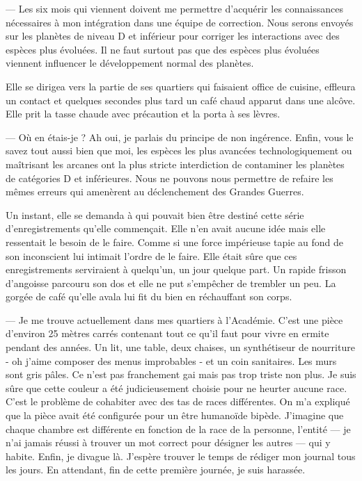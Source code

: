 \documentclass[ebook,12pt,oneside,onecolumn,openright,draft]{memoir}
\begin{document}
— Les six mois qui viennent doivent me permettre d'acquérir les connaissances
nécessaires à mon intégration dans une équipe de correction. Nous serons envoyés
sur les planètes de niveau D et inférieur pour corriger les interactions avec
des espèces plus évoluées. Il ne faut surtout pas que des espèces plus évoluées
viennent influencer le développement normal des planètes.

Elle se dirigea vers la partie de ses quartiers qui faisaient office de cuisine,
effleura un contact et quelques secondes plus tard un café chaud apparut dans
une alcôve. Elle prit la tasse chaude avec précaution et la porta à ses lèvres.

— Où en étais-je ? Ah oui, je parlais du principe de non ingérence. Enfin, vous
le savez tout aussi bien que moi, les espèces les plus avancées
technologiquement ou maîtrisant les arcanes ont la plus stricte interdiction de
contaminer les planètes de catégories D et inférieures. Nous ne pouvons nous
permettre de refaire les mêmes erreurs qui amenèrent au déclenchement des
Grandes Guerres.

Un instant, elle se demanda à qui pouvait bien être destiné cette série
d'enregistrements qu'elle commençait. Elle n'en avait aucune idée mais elle
ressentait le besoin de le faire. Comme si une force impérieuse tapie au fond de
son inconscient lui intimait l'ordre de le faire. Elle était sûre que ces
enregistrements serviraient à quelqu'un, un jour quelque part. Un rapide frisson
d'angoisse parcouru son dos et elle ne put s'empêcher de trembler un peu. La
gorgée de café qu'elle avala lui fit du bien en réchauffant son corps.

— Je me trouve actuellement dans mes quartiers à l'Académie. C'est une pièce
d'environ 25 mètres carrés contenant tout ce qu'il faut pour vivre en ermite
pendant des années. Un lit, une table, deux chaises, un synthétiseur de
nourriture - oh j'aime composer des menus improbables - et un coin sanitaires.
Les murs sont gris pâles. Ce n'est pas franchement gai mais pas trop triste non
plus. Je suis sûre que cette couleur a été judicieusement choisie pour ne
heurter aucune race. C'est le problème de cohabiter avec des tas de races
différentes. On m'a expliqué que la pièce avait été configurée pour un être
humanoïde bipède. J'imagine que chaque chambre est différente en fonction de la
race de la personne, l'entité — je n'ai jamais réussi à trouver un mot correct
pour désigner les autres — qui y habite. Enfin, je divague là. J'espère trouver
le temps de rédiger mon journal tous les jours. En attendant, fin de cette
première journée, je suis harassée.
\end{document}
